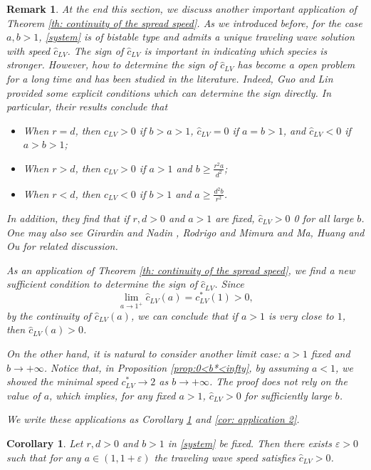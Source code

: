 \documentclass[11pt,a4paper]{article}
\newtheorem{corollary}[theorem]{\textbf{Corollary}}
\newtheorem{remark}[theorem]{\textbf{Remark}}
\numberwithin{equation}{section}
\numberwithin{figure}{section}
\begin{document}
\begin{remark}
At the end this section, we discuss another important application of Theorem \ref{th: continuity of the spread speed}. As we introduced before, for the case $a,b>1$, \eqref{system} is of bistable type and admits a unique traveling wave solution with speed $\hat c_{LV}$. The sign of $\hat c_{LV}$ is important in indicating which species is stronger. However, how to determine the sign of $\hat c_{LV}$ has become a open problem for a long time and has been studied in the literature. Indeed, Guo and Lin \cite{Guo Lin} provided some explicit conditions which can determine the sign directly. In particular, their results conclude that
\begin{itemize}
    \item When $r = d$, then $\hat c_{LV}>0$ if $b > a > 1$, $\hat c_{LV}=0$ if $a = b > 1$,  and $\hat c_{LV}<0$ if $a > b > 1$;
    \item When $r > d$, then $\hat c_{LV}>0$ if $a > 1$ and $b\ge \frac{r^2a}{d^2}$;
\item When $r < d$, then $\hat c_{LV}<0$ if $b > 1$ and $a\ge \frac{d^2b}{r^2}$.
 \end{itemize}
 In addition, they find that if $r, d > 0$ and $a > 1$ are fixed, $\hat c_{LV}>0$ 0 for all large $b$. One
may also see Girardin and Nadin \cite{Girardin Nadin} , Rodrigo and Mimura \cite{Rodrigo Mimura} and Ma, Huang and Ou \cite{Ma Huang Ou} for
related discussion.

As an application of Theorem \ref{th: continuity of the spread speed}, we find a new sufficient condition to determine the sign of $\hat c_{LV}$. Since 
$$\lim_{a\to 1^+}\hat c_{LV}(a)=c^*_{LV}(1)>0,$$
by the continuity of $\hat c_{LV}(a)$, we can conclude that if $a>1$ is very close to $1$, then  $\hat c_{LV}(a)>0$. 

On the other hand, it is natural to consider another limit case: $a>1$ fixed and $b\to +\infty$. Notice that, in Proposition \ref{prop:0<b*<infty}, by assuming $a<1$, we showed the minimal speed $c^*_{LV}\to 2$ as $b\to +\infty$. The proof does not rely on the value of $a$, which implies, for any fixed $a>1$, $\hat c_{LV}>0$ for sufficiently large $b$. 


We write these applications as Corollary \ref{cor: application} and \ref{cor: application 2}.
\end{remark}

\begin{corollary}\label{cor: application}
Let $r,d>0$ and $b>1$ in \eqref{system} be fixed. Then there exists $\varepsilon>0$ such that for any $a\in (1,1+\varepsilon)$ the traveling wave speed satisfies $\hat c_{LV}>0$.
\end{corollary}
\end{document}
